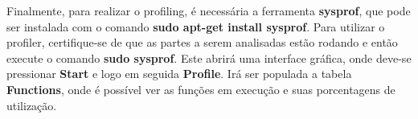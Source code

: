 \documentclass[
	12pt,				%
	openright,			%
	oneside,			%
	a4paper,			%
	english,			%
	french,				%
	spanish,			%
	brazil,				%
	]{abntex2}
\begin{document}
\begin{anexosenv}
Finalmente, para realizar o profiling, é necessária a ferramenta \textbf{sysprof}, que pode ser instalada com o comando \textbf{sudo apt-get install sysprof}. Para utilizar o profiler, certifique-se de que as partes a serem analisadas estão rodando e então execute o comando \textbf{sudo sysprof}. Este abrirá uma interface gráfica, onde deve-se pressionar \textbf{Start} e logo em seguida \textbf{Profile}. Irá ser populada a tabela \textbf{Functions}, onde é possível ver as funções em execução e suas porcentagens de utilização.

\end{anexosenv}
\end{document}
